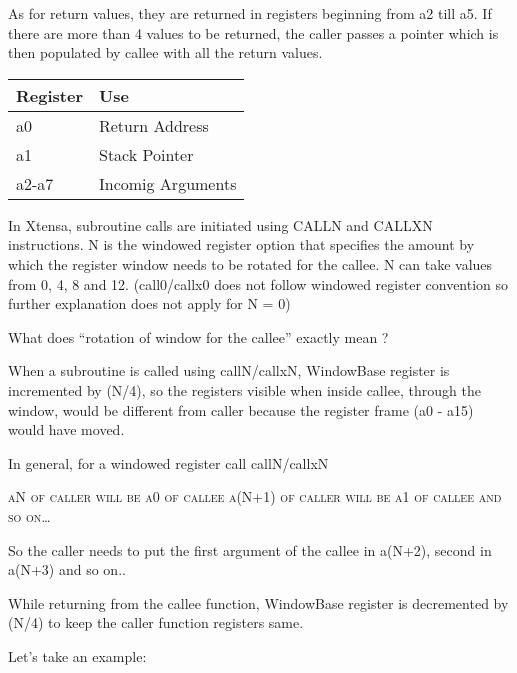 As for return values, they are returned in registers beginning from a2 till a5. If there are more than 4 values to be returned, the caller passes a pointer which is then populated by callee with all the return values.


\begin{longtable}{|p{5cm}|p{5cm}|}
	\hline
	Register & Use \\
	\hline
	a0 & Return Address\\ \hline
	a1 & Stack Pointer\\ \hline
	a2-a7 & Incomig Arguments\\ \hline
\end{longtable}

In Xtensa, subroutine calls are initiated using CALLN and CALLXN instructions. N is the windowed register option that specifies the amount by which the register window needs to be rotated for the callee. N can take values from 0, 4, 8 and 12. (call0/callx0 does not follow windowed register convention so further explanation does not apply for N = 0)

What does “rotation of window for the callee” exactly mean ?

When a subroutine is called using callN/callxN, WindowBase register is incremented by (N/4), so the registers visible when inside callee, through the window, would be different from caller because the register frame (a0 - a15) would have moved.

In general, for a windowed register call callN/callxN


\begin{tcolorbox}
	\textsc{aN of caller will be a0 of callee \newline a(N+1) of caller will be a1 of callee and so on…}
\end{tcolorbox}

So the caller needs to put the first argument of the callee in a(N+2), second in a(N+3) and so on..

While returning from the callee function, WindowBase register is decremented by (N/4) to keep the caller function registers same.

Let’s take an example:

